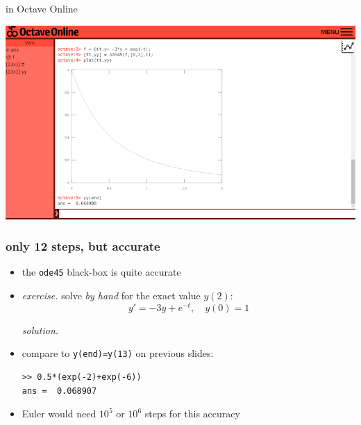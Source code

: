 \documentclass[urlcolor=blue,dvipsnames]{beamer}
\begin{document}
\begin{frame}{in Octave Online}

\includegraphics[width=1.05\textwidth]{figs/octaveonline}
\end{frame}


\begin{frame}[fragile]
\frametitle{only 12 steps, but accurate}

\begin{itemize}
\item the \texttt{ode45} black-box is quite accurate
\item \emph{exercise.} solve \emph{by hand} for the exact value $y(2)$:
    $$y' = - 3 y + e^{-t}, \quad y(0)=1$$

\noindent \emph{solution.}

\vspace{30mm}
\item compare to \texttt{y(end)=y(13)} on previous slides:

\begin{Verbatim}
>> 0.5*(exp(-2)+exp(-6))
ans =  0.068907
\end{Verbatim}
\item Euler would need $10^5$ or $10^6$ steps for this accuracy
\end{itemize}
\end{frame}
\end{document}
